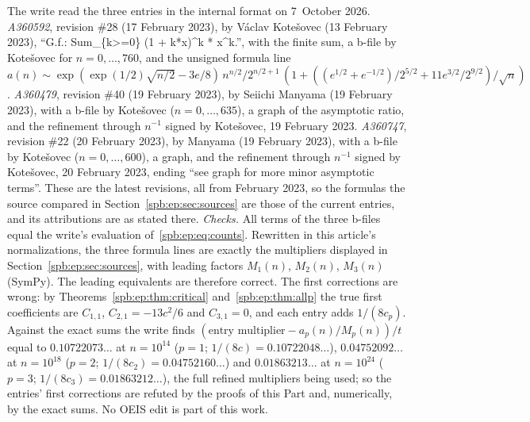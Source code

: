 \begin{remark}\label{spb:ep:rem:oeis}
The write read the three entries in the internal format on 7~October 2026.
\emph{A360592}, revision \#28 (17 February 2023), by V\'aclav Kote\v{s}ovec
(13 February 2023), ``G.f.: Sum\_\{k>=0\} (1 + k*x)\^{}k * x\^{}k.'', with the
finite sum, a b-file by Kote\v{s}ovec for $n=0,\ldots,760$, and the unsigned
formula line $a(n)\sim\exp(\exp(1/2)\sqrt{n/2}-3e/8)\,n^{n/2}/2^{n/2+1}\,
(1+((e^{1/2}+e^{-1/2})/2^{5/2}+11e^{3/2}/2^{9/2})/\sqrt n)$.
\emph{A360479}, revision \#40 (19 February 2023), by Seiichi Manyama
(19 February 2023), with a b-file by Kote\v{s}ovec ($n=0,\ldots,635$), a graph
of the asymptotic ratio, and the refinement through $n^{-1}$ signed by
Kote\v{s}ovec, 19 February 2023. \emph{A360747}, revision \#22 (20 February
2023), by Manyama (19 February 2023), with a b-file by Kote\v{s}ovec
($n=0,\ldots,600$), a graph, and the refinement through $n^{-1}$ signed by
Kote\v{s}ovec, 20 February 2023, ending ``see graph for more minor asymptotic
terms''. These are the latest revisions, all from February 2023, so the
formulas the source compared in Section~\ref{spb:ep:sec:sources} are those of
the current entries, and its attributions are as stated there.
\emph{Checks.} All terms of the three b-files equal the write's
evaluation of~\eqref{spb:ep:eq:counts}. Rewritten in this article's
normalizations, the three formula lines are exactly the multipliers displayed
in Section~\ref{spb:ep:sec:sources}, with leading factors $M_1(n)$, $M_2(n)$,
$M_3(n)$ (SymPy). The leading equivalents are therefore correct. The first
corrections are wrong: by Theorems~\ref{spb:ep:thm:critical}
and~\ref{spb:ep:thm:allp} the true first coefficients are $C_{1,1}$,
$C_{2,1}=-13c^2/6$ and $C_{3,1}=0$, and each entry adds $1/(8c_p)$. Against
the exact sums the write finds $(\text{entry multiplier}-a_p(n)/M_p(n))/t$
equal to $0.10722073\ldots$ at $n=10^{14}$ ($p=1$; $1/(8c)=0.10722048\ldots$),
$0.04752092\ldots$ at $n=10^{18}$ ($p=2$; $1/(8c_2)=0.04752160\ldots$) and
$0.01863213\ldots$ at $n=10^{24}$ ($p=3$; $1/(8c_3)=0.01863212\ldots$), the
full refined multipliers being used; so the entries' first corrections are
refuted by the proofs of this Part and, numerically, by the exact sums. No OEIS
edit is part of this work.
\end{remark}
